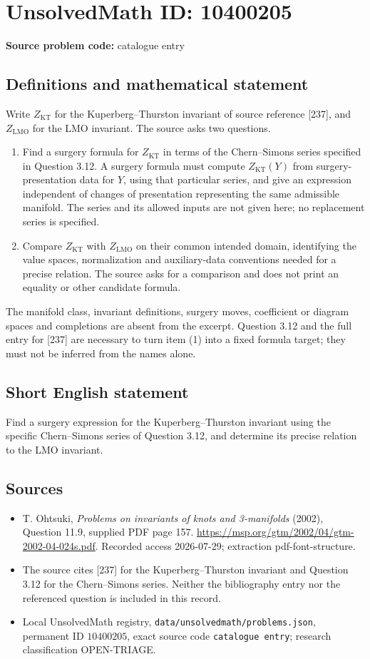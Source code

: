 \documentclass[11pt]{article}
\begin{document}
\section*{UnsolvedMath ID: 10400205}
\textbf{Source problem code:} catalogue entry
\subsection{Definitions and mathematical statement}
Write \(Z_{\mathrm{KT}}\) for the Kuperberg--Thurston invariant of source reference [237], and \(Z_{\mathrm{LMO}}\) for the LMO invariant. The source asks two questions.
\begin{enumerate}
\item Find a surgery formula for \(Z_{\mathrm{KT}}\) in terms of the Chern--Simons series specified in Question 3.12. A surgery formula must compute \(Z_{\mathrm{KT}}(Y)\) from surgery-presentation data for \(Y\), using that particular series, and give an expression independent of changes of presentation representing the same admissible manifold. The series and its allowed inputs are not given here; no replacement series is specified.
\item Compare \(Z_{\mathrm{KT}}\) with \(Z_{\mathrm{LMO}}\) on their common intended domain, identifying the value spaces, normalization and auxiliary-data conventions needed for a precise relation. The source asks for a comparison and does not print an equality or other candidate formula.
\end{enumerate}
The manifold class, invariant definitions, surgery moves, coefficient or diagram spaces and completions are absent from the excerpt. Question 3.12 and the full entry for [237] are necessary to turn item (1) into a fixed formula target; they must not be inferred from the names alone.
\subsection{Short English statement}
Find a surgery expression for the Kuperberg--Thurston invariant using the specific Chern--Simons series of Question 3.12, and determine its precise relation to the LMO invariant.
\subsection{Sources}
\begin{itemize}
\item T. Ohtsuki, \emph{Problems on invariants of knots and 3-manifolds} (2002), Question 11.9, supplied PDF page 157. \url{https://msp.org/gtm/2002/04/gtm-2002-04-024s.pdf}. Recorded access 2026-07-29; extraction pdf-font-structure.
\item The source cites [237] for the Kuperberg--Thurston invariant and Question 3.12 for the Chern--Simons series. Neither the bibliography entry nor the referenced question is included in this record.
\item Local UnsolvedMath registry, \texttt{data/unsolvedmath/problems.json}, permanent ID \(10400205\), exact source code \texttt{catalogue entry}; research classification OPEN-TRIAGE.
\end{itemize}
\end{document}
